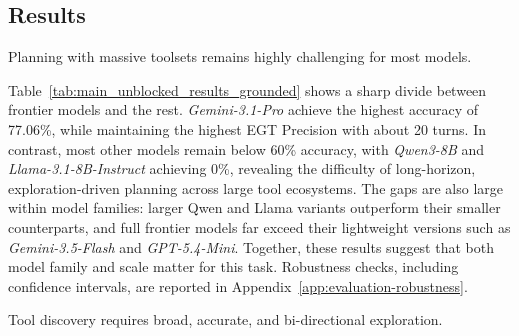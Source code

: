 


\subsection{Results}


\begin{takeaway}
Planning with massive toolsets remains highly challenging for most models.
\end{takeaway}

\noindent Table~\ref{tab:main_unblocked_results_grounded} shows a sharp divide between frontier models and the rest. 
\textit{Gemini-3.1-Pro} achieve the highest accuracy of 77.06\%, while maintaining the highest EGT Precision with about 20 turns. 
In contrast, most other models remain below 60\% accuracy, with \textit{Qwen3-8B} and \textit{Llama-3.1-8B-Instruct} achieving 0\%, revealing the difficulty of long-horizon, exploration-driven planning across large tool ecosystems.
The gaps are also large within model families: larger Qwen and Llama variants outperform their smaller counterparts, and full frontier models far exceed their lightweight versions such as \textit{Gemini-3.5-Flash} and \textit{GPT-5.4-Mini}. 
Together, these results suggest that both model family and scale matter for this task.
Robustness checks, including confidence intervals, are reported in Appendix~\ref{app:evaluation-robustness}.

% 

\begin{takeaway}
Tool discovery requires broad, accurate, and bi-directional exploration.
\end{takeaway}


